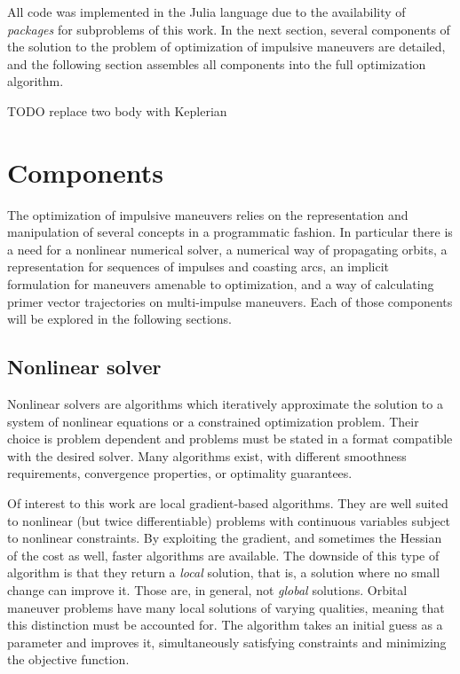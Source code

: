 
All code was implemented in the Julia language due to the availability of \textit{packages} for subproblems of this work. In the next section, several components of the solution to the problem of optimization of impulsive maneuvers are detailed, and the following section assembles all components into the full optimization algorithm.

TODO replace two body with Keplerian

\section{Components}

The optimization of impulsive maneuvers relies on the representation and manipulation of several concepts in a programmatic fashion. In particular there is a need for a nonlinear numerical solver, a numerical way of propagating orbits, a representation for sequences of impulses and coasting arcs, an implicit formulation for maneuvers amenable to optimization, and a way of calculating primer vector trajectories on multi-impulse maneuvers. Each of those components will be explored in the following sections.

\subsection{Nonlinear solver}\label{sssec:solver}

Nonlinear solvers are algorithms which iteratively approximate the solution to a system of nonlinear equations or a constrained optimization problem. Their choice is problem dependent and problems must be stated in a format compatible with the desired solver. Many algorithms exist, with different smoothness requirements, convergence properties, or optimality guarantees. 

Of interest to this work are local gradient-based algorithms. They are well suited to nonlinear (but twice differentiable) problems with continuous variables subject to nonlinear constraints. By exploiting the gradient, and sometimes the Hessian of the cost as well, faster algorithms are available. The downside of this type of algorithm is that they return a \textit{local} solution, that is, a solution where no small change can improve it. Those are, in general, not \textit{global} solutions. Orbital maneuver problems have many local solutions of varying qualities, meaning that this distinction must be accounted for. The algorithm takes an initial guess as a parameter and improves it, simultaneously satisfying constraints and minimizing the objective function.

